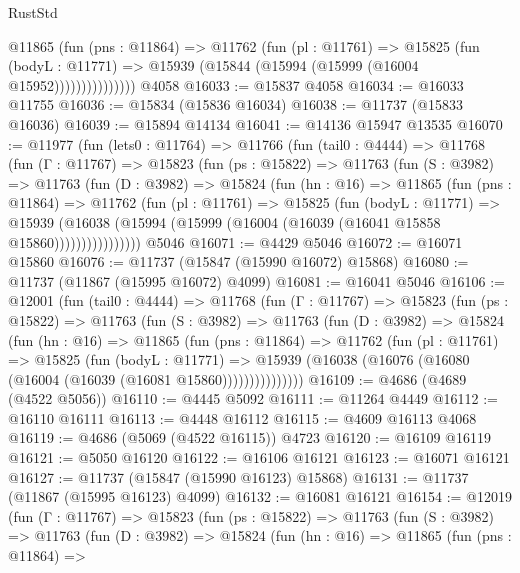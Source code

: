 \begin{lexlean}{RustStd}
\begin{coremodule}
                  @11865
                    (fun (pns : @11864) =>
                    @11762
                      (fun (pl : @11761) =>
                      @15825
                        (fun (bodyL : @11771) =>
                        @15939 (@15844 (@15994 (@15999 (@16004 @15952)))))))))))))))
    @4058
@16033 := @15837 @4058
@16034 := @16033 @11755
@16036 := @15834 (@15836 @16034)
@16038 := @11737 (@15833 @16036)
@16039 := @15894 @14134
@16041 := @14136 @15947 @13535
@16070 := @11977
    (fun (lets0 : @11764) =>
    @11766
      (fun (tail0 : @4444) =>
      @11768
        (fun (Γ : @11767) =>
        @15823
          (fun (ps : @15822) =>
          @11763
            (fun (S : @3982) =>
            @11763
              (fun (D : @3982) =>
              @15824
                (fun (hn : @16) =>
                @11865
                  (fun (pns : @11864) =>
                  @11762
                    (fun (pl : @11761) =>
                    @15825
                      (fun (bodyL : @11771) =>
                      @15939
                        (@16038
                          (@15994 (@15999 (@16004 (@16039 (@16041 @15858 @15860))))))))))))))))
    @5046
@16071 := @4429 @5046
@16072 := @16071 @15860
@16076 := @11737 (@15847 (@15990 @16072) @15868)
@16080 := @11737 (@11867 (@15995 @16072) @4099)
@16081 := @16041 @5046
@16106 := @12001
    (fun (tail0 : @4444) =>
    @11768
      (fun (Γ : @11767) =>
      @15823
        (fun (ps : @15822) =>
        @11763
          (fun (S : @3982) =>
          @11763
            (fun (D : @3982) =>
            @15824
              (fun (hn : @16) =>
              @11865
                (fun (pns : @11864) =>
                @11762
                  (fun (pl : @11761) =>
                  @15825
                    (fun (bodyL : @11771) =>
                    @15939 (@16038 (@16076 (@16080 (@16004 (@16039 (@16081 @15860)))))))))))))))
@16109 := @4686 (@4689 (@4522 @5056))
@16110 := @4445 @5092
@16111 := @11264 @4449
@16112 := @16110 @16111
@16113 := @4448 @16112
@16115 := @4609 @16113 @4068
@16119 := @4686 (@5069 (@4522 @16115)) @4723
@16120 := @16109 @16119
@16121 := @5050 @16120
@16122 := @16106 @16121
@16123 := @16071 @16121
@16127 := @11737 (@15847 (@15990 @16123) @15868)
@16131 := @11737 (@11867 (@15995 @16123) @4099)
@16132 := @16081 @16121
@16154 := @12019
    (fun (Γ : @11767) =>
    @15823
      (fun (ps : @15822) =>
      @11763
        (fun (S : @3982) =>
        @11763
          (fun (D : @3982) =>
          @15824
            (fun (hn : @16) =>
            @11865
              (fun (pns : @11864) =>

\end{coremodule}
\end{lexlean}
